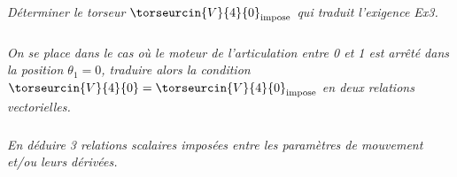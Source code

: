 \begin{multicols}{2}
\subparagraph{}
\textit{Déterminer le torseur $\torseurcin{V}{4}{0}_{\text{impose}}$ qui traduit l'exigence Ex3.}



\subparagraph{}
\textit{On se place dans le cas où le moteur de l’articulation entre 0 et 1 est arrêté dans la position $\theta_1=0$, traduire
alors la condition $\torseurcin{V}{4}{0}=\torseurcin{V}{4}{0}_{\text{impose}}$ en deux relations vectorielles.}


\subparagraph{}
\textit{En déduire 3 relations scalaires imposées entre les paramètres de mouvement et/ou leurs dérivées.}
\ifprof
\else
\end{multicols}
\fi


